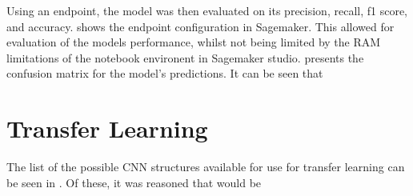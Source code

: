 Using an endpoint, the model was then evaluated on its precision, recall, f1 score, and accuracy.  shows the endpoint configuration in Sagemaker. This allowed for evaluation of the models performance, whilst not being limited by the RAM limitations of the notebook environent in Sagemaker studio.  presents the confusion matrix for the model's predictions. It can be seen that 


\section{Transfer Learning}

The list of the possible CNN structures available for use for transfer learning can be seen in \cite{keras_applications}. Of these, it was reasoned that  would be 